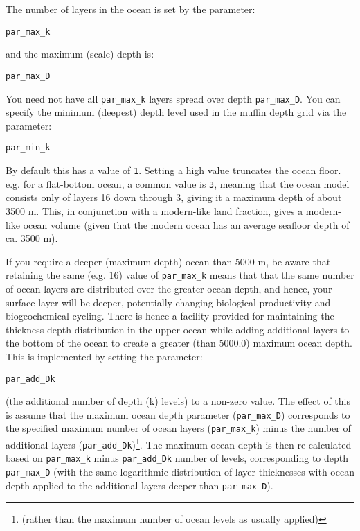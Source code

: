 \documentclass[11pt,fleqn]{book} %
\begin{document}
The number of layers in the ocean is set by the parameter:

\vspace{1mm}
\texttt{par\_max\_k}
\vspace{1mm}

\noindent and the maximum (scale) depth is:

\vspace{1mm}
\texttt{par\_max\_D}
\vspace{1mm}
 
You need not have all \texttt{par\_max\_k} layers spread over depth \texttt{par\_max\_D}. You can specify the minimum (deepest) depth level used in the muffin depth grid via the parameter:

\vspace{1mm}
\texttt{par\_min\_k}
\vspace{1mm}

\noindent By default this has a value of \texttt{1}. Setting a high value truncates the ocean floor. e.g. for a flat-bottom ocean, a common value is \texttt{3}, meaning that the ocean model consists only of layers 16 down through 3, giving it a maximum depth of about 3500 m. This, in conjunction with a modern-like land fraction, gives a modern-like ocean volume (given that the modern ocean has an average seafloor depth of ca. 3500 m).

If you require a deeper (maximum depth) ocean than 5000 m, be aware that retaining the same (e.g. 16) value of \texttt{par\_max\_k} means that that the same number of ocean layers are distributed over the greater ocean depth, and hence, your surface layer will be deeper, potentially changing biological productivity and biogeochemical cycling. There is hence a facility provided for maintaining the thickness depth distribution in the upper ocean while adding additional layers to the bottom of the ocean to create a greater (than 5000.0) maximum ocean depth. This is implemented by setting the parameter:

\vspace{1mm}
\texttt{par\_add\_Dk}
\vspace{1mm}

\noindent (the additional number of depth (k) levels) to a non-zero value. The effect of this is assume that the maximum ocean depth parameter (\texttt{par\_max\_D}) corresponds to the specified maximum number of ocean layers (\texttt{par\_max\_k}) minus the number of additional layers (\texttt{par\_add\_Dk})\footnote{(rather than the maximum number of ocean levels as usually applied)}.  The maximum ocean depth is then re-calculated based on \texttt{par\_max\_k} minus \texttt{par\_add\_Dk} number of levels, corresponding to depth \texttt{par\_max\_D} (with the same logarithmic distribution of layer thicknesses with ocean depth applied to the additional layers deeper than \texttt{par\_max\_D}).
\end{document}

